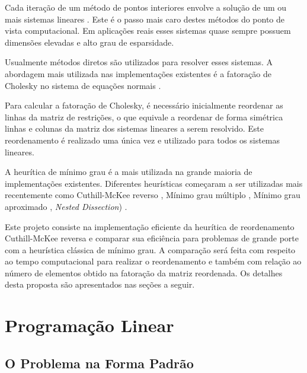 \documentclass[12pt]{article}
\begin{document}
Cada iteração de um método de pontos interiores envolve a solução
de um ou mais sistemas lineares \cite{Go96,LMS92,Me92b}. Este é o passo mais
caro destes métodos do ponto de vista computacional.
Em aplicações reais esses sistemas quase
sempre possuem dimensões elevadas e alto grau de esparsidade.

Usualmente métodos diretos são utilizados para resolver esses sistemas.
A abordagem mais utilizada nas implementações existentes é a fatoração
de Cholesky no sistema de equações normais \cite{ARVK89,CMWW96,Go96,LMS92}.

Para calcular a fatoração de Cholesky, é necessário inicialmente reordenar
as linhas da matriz de restrições, o que equivale a reordenar de forma
simétrica linhas e colunas da matriz dos sistemas lineares a serem resolvido.
Este reordenamento é realizado uma única vez e utilizado para todos os
sistemas lineares.

A heurítica de mínimo grau \cite{GL89} é a mais utilizada na grande maioria de
implementações existentes. Diferentes heurísticas começaram a ser utilizadas
mais recentemente como Cuthill-McKee reverso \cite{CM69}, Mínimo grau
múltiplo \cite{Li85}, Mínimo grau aproximado \cite{ADD96}, {\it Nested
Dissection}) \cite{RH98}.

Este projeto consiste na implementação eficiente da heurítica de reordenamento
Cuthill-McKee reversa e comparar sua eficiência para problemas de grande
porte com a heurística clássica de mínimo grau. A comparação será feita
com respeito ao tempo computacional para realizar o reordenamento e também
com relação ao número de elementos obtido na fatoração da matriz reordenada.
Os detalhes desta proposta são apresentados nas seções a seguir.

\section{Programação Linear}

\subsection{O Problema na Forma Padrão}
\end{document}
